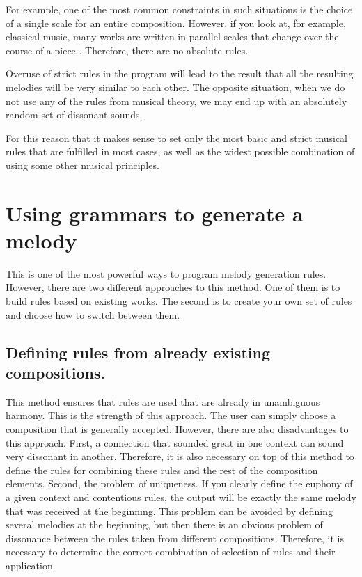 \documentclass[thesis=B,english]{FITthesis}[2019/12/23]
\begin{document}
For example, one of the most common constraints in such situations is the choice of a single scale for an entire composition. However, if you look at, for example, classical music, many works are written in parallel scales that change over the course of a piece \cite{few_scales_in_one_song}. Therefore, there are no absolute rules.

Overuse of strict rules in the program will lead to the result that all the resulting melodies will be very similar to each other. The opposite situation, when we do not use any of the rules from musical theory, we may end up with an absolutely random set of dissonant sounds.

For this reason that it makes sense to set only the most basic and strict musical rules that are fulfilled in most cases, as well as the widest possible combination of using some other musical principles.

\section{Using grammars to generate a melody}

This is one of the most powerful ways to program melody generation rules. However, there are two different approaches to this method. One of them is to build rules based on existing works. The second is to create your own set of rules and choose how to switch between them.

\subsection{Defining rules from already existing compositions.}

This method ensures that rules are used that are already in unambiguous harmony. This is the strength of this approach. The user can simply choose a composition that is generally accepted. However, there are also disadvantages to this approach. First, a connection that sounded great in one context can sound very dissonant in another. Therefore, it is also necessary on top of this method to define the rules for combining these rules and the rest of the composition elements. Second, the problem of uniqueness. If you clearly define the euphony of a given context and contentious rules, the output will be exactly the same melody that was received at the beginning. This problem can be avoided by defining several melodies at the beginning, but then there is an obvious problem of dissonance between the rules taken from different compositions. Therefore, it is necessary to determine the correct combination of selection of rules and their application.
\end{document}
